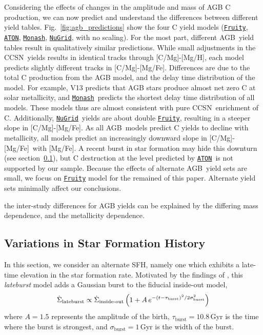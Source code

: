 \documentclass[fleqn,
usenatbib]{mnras}
\newcommand{\JJ}{\citetalias{james+21}}
\newcommand{\fruity}{\texttt{\hyperlink{fruity}{Fruity}}}
\newcommand{\nugrid}{\texttt{\hyperlink{nugrid}{NuGrid}}}
\newcommand{\monash}{\texttt{\hyperlink{monash}{Monash}}}
\newcommand{\aton}{\texttt{\hyperlink{aton}{ATON}}}
\newcommand{\agb}{AGB}
\newcommand{\cc}{CCSN}
\newcommand{\caah}{[C/Mg]-[Mg/H]}
\newcommand{\caafe}{[C/Mg]-[Mg/Fe]}
\newcommand{\dbadd}[1]{{\color{Thistle} #1}}
\begin{document}
Considering the effects of changes in the amplitude and mass of AGB C production, we can now predict and understand the differences between different yield tables.
Fig.~\ref{fig:agb_predictions} show the four C yield models (\fruity, \aton, \monash, \nugrid, with no scaling). For the most part, different \agb\ yield tables result in qualitatively similar predictions. While small adjustments in the \cc\ yields results in identical tracks through \caah, each model predicts slightly different tracks in \caafe. Differences are due to the total C production from the AGB model, and the delay time distribution of the model. For example, V13 predicts that AGB stars produce almost net zero C at solar metallicity, and \monash\ predicts the shortest delay time distribution of all models. These models thus are almost consistent with pure \cc\ enrichment of C. Additionally, \nugrid\ yields are about double \fruity, resulting in a steeper slope in \caafe.
As all \agb\ models predict C yields to decline with metallicity, all models predict an increasingly downward slope in \caafe\ with [Mg/Fe]. A recent burst in star formation may hide this downturn (see section~\ref{sec:sfh}), but C destruction at the level predicted by \aton\ is not supported by our sample. 
Because the effects of alternate \agb\ yield sets are small, we focus on \fruity{} model for the remained of this paper. Alternate yield sets minimally affect our conclusions. 


\dbadd{the inter-study differences for AGB yields can be explained by the differing mass dependence, and the metallicity dependence.}


\subsection{Variations in Star Formation History} \label{sec:sfh}
In this section, we consider an alternate SFH, namely one which exhibits a late-time elevation in the star formation rate. Motivated by the findings of \citet[see discussion in \JJ]{mor+19,isern19}, this \textit{lateburst} model
adds a Gaussian burst to the fiducial inside-out model, 
\begin{equation}\label{eq:lateburst}
    \dot{\Sigma}_\text{lateburst} \propto \dot{\Sigma}_\text{inside-out} \left(1 + A\,e^{-(t-\tau_{\rm burst})^2/2\sigma^2_{\rm burst}} \right)
\end{equation}
where $A=1.5$ represents the amplitude of the birth, $\tau_\text{burst}=10.8$\,Gyr is the time where the burst is strongest, and $\sigma_\text{burst}=1$\,Gyr is the width of the burst.
\end{document}
